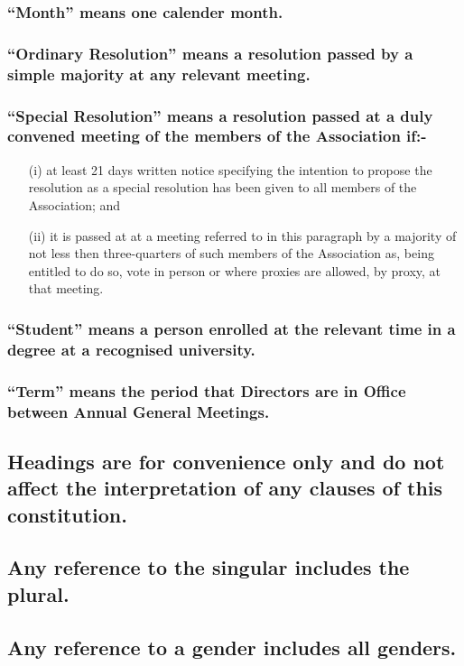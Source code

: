 \documentclass{article}
\newenvironment{subs}
  {\adjustwidth{2em}{0pt}}
  {\endadjustwidth}
\begin{document}
\begin{subs}
\begin{subs}
\subsubsection{``Month'' means one calender month.}
\subsubsection{``Ordinary Resolution'' means a resolution passed by a simple majority at any relevant meeting.} 
\subsubsection{``Special Resolution'' means a resolution passed at a duly convened meeting of the members of the Association if:-}
\begin{subs}
\begin{itemize}
\item[(i)] at least 21 days  written notice specifying the intention to propose the resolution as a special resolution has been given to all members of the Association; and
\item[(ii)] it is passed at at a meeting referred to in this paragraph by a majority of not less then three-quarters of such members of the Association as, being entitled to do so, vote in person or where proxies are allowed, by proxy, at that meeting.
\end{itemize}
\end{subs}
\subsubsection{``Student'' means a person enrolled at the relevant time in a degree at a recognised university.}
\subsubsection{``Term'' means the period that Directors are in Office between Annual General Meetings.}
\end{subs}
\subsection{Headings are for convenience only and do not affect the interpretation of any clauses of this constitution.}
\subsection{Any reference to the singular includes the plural.}
\subsection{Any reference to a gender includes all genders.}

\end{subs}
\end{document}
